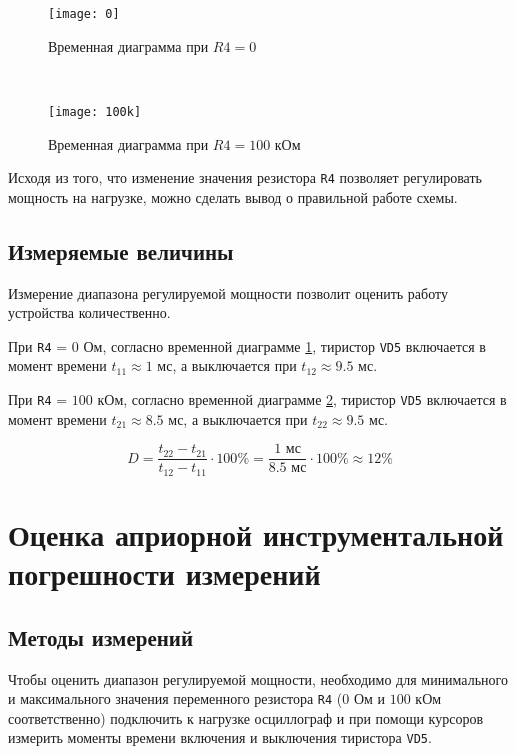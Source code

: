 \begin{figure}[H]
\begin{center}
	\texttt{[image: 0]}
	\caption{Временная диаграмма при $R4 = 0$}
	\label{pic:diag:0}
\end{center}
\end{figure}

~

\begin{figure}[H]
\begin{center}
	\texttt{[image: 100k]}
	\caption{Временная диаграмма при $R4 = 100$ кОм}
	\label{pic:diag:100k}
\end{center}
\end{figure}

Исходя из того, что изменение значения резистора \verb+R4+ позволяет регулировать мощность на нагрузке, можно сделать вывод о правильной работе схемы.

\subsection{Измеряемые величины}

Измерение диапазона регулируемой мощности позволит оценить работу устройства количественно.

При \verb+R4+ = $0$ Ом, согласно временной диаграмме \ref{pic:diag:0}, тиристор \verb+VD5+ включается в момент времени $t_{11} \approx 1$ мс, а выключается при $t_{12} \approx 9.5$ мс.

При \verb+R4+ = $100$ кОм, согласно временной диаграмме \ref{pic:diag:100k}, тиристор \verb+VD5+ включается в момент времени $t_{21} \approx 8.5$ мс, а выключается при $t_{22} \approx 9.5$ мс.

\begin{equation}
\label{eq:1:1}
	D = \frac{t_{22} - t_{21}}{t_{12} - t_{11}} \cdot 100\% = \frac{1 \text{ мс}}{8.5 \text{ мс}} \cdot 100\% \approx 12 \% 
\end{equation}

\section{Оценка априорной инструментальной погрешности измерений}

\subsection{Методы измерений}

Чтобы оценить диапазон регулируемой мощности, необходимо для минимального и максимального значения переменного резистора \verb+R4+ ($0$ Ом и $100$ кОм соответственно) подключить к нагрузке осциллограф и при помощи курсоров измерить моменты времени включения и выключения тиристора \verb+VD5+.

